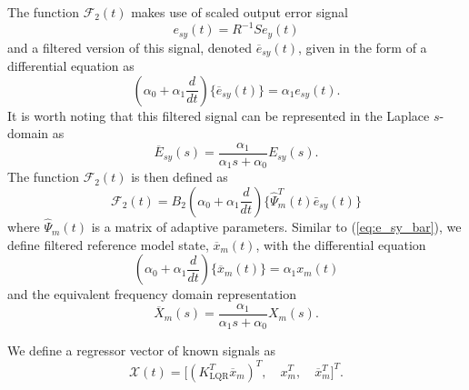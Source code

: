 The function $\mathcal{F}_2(t)$ makes use of scaled output error signal
\begin{equation}
	e_{sy}(t) = R^{-1} S e_y(t) \label{eq:esy}
\end{equation}
and a filtered version of this signal, denoted $\overline{e}_{sy}(t)$, given in the form of a differential equation as
\begin{equation}
(\alpha_0 + \alpha_1 \frac{d}{dt}) \big\{ \overline{e}_{sy}(t) \big\} = \alpha_1 e_{sy}(t). \label{eq:e_sy_bar}
\end{equation}
It is worth noting that this filtered signal can be represented in the Laplace $s$-domain as
\begin{equation*}
	\overline{E}_{sy}(s) = \frac{\alpha_1}{\alpha_1 s + \alpha_0} E_{sy}(s).
\end{equation*}
The function $\mathcal{F}_2(t)$ is then defined as
\begin{equation}
\mathcal{F}_2(t) = B_2 (\alpha_0 + \alpha_1 \frac{d}{dt})\big\{ \hat{\Psi}_m^T (t) \bar{e}_{sy}(t) \big\} \label{eq:F2}
\end{equation}
where $\hat{\Psi}_m(t)$ is a matrix of adaptive parameters. Similar to (\ref{eq:e_sy_bar}), we define filtered reference model state, $\overline{x}_m(t)$, with the differential equation
\begin{equation}
(\alpha_0 + \alpha_1 \frac{d}{dt}) \big\{ \overline{x}_{m}(t) \big\} = \alpha_1 x_{m}(t)\label{eq:xm_bar}
\end{equation}
and the equivalent frequency domain representation
\begin{equation}
	\overline{X}_{m}(s) = \frac{\alpha_1}{\alpha_1 s + \alpha_0} X_{m}(s).
\end{equation}

We define a regressor vector of known signals as
\begin{equation}
\mathcal{X}(t) = \big[ (K_{\textrm{LQR}}^T \overline{x}_m)^T,\quad x_m^T,\quad \overline{x}_m^T \big]^T.
\end{equation}

